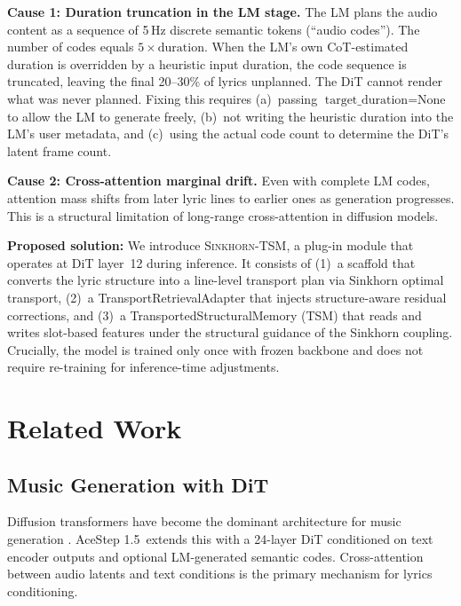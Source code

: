 \documentclass[11pt,a4paper]{article}
\newcommand{\method}{\textsc{Sinkhorn-TSM}}
\newcommand{\dit}{AceStep 1.5}
\begin{document}
\textbf{Cause 1: Duration truncation in the LM stage.} The LM plans the audio content as a sequence of 5\,Hz discrete semantic tokens (``audio codes''). The number of codes equals $5 \times \text{duration}$. When the LM's own CoT-estimated duration is overridden by a heuristic input duration, the code sequence is truncated, leaving the final 20--30\% of lyrics unplanned. The DiT cannot render what was never planned. Fixing this requires (a)~passing $\text{target\_duration}=\text{None}$ to allow the LM to generate freely, (b)~not writing the heuristic duration into the LM's user metadata, and (c)~using the actual code count to determine the DiT's latent frame count.

\textbf{Cause 2: Cross-attention marginal drift.} Even with complete LM codes, attention mass shifts from later lyric lines to earlier ones as generation progresses. This is a structural limitation of long-range cross-attention in diffusion models.

\textbf{Proposed solution:} We introduce \method, a plug-in module that operates at DiT layer~12 during inference. It consists of (1)~a scaffold that converts the lyric structure into a line-level transport plan via Sinkhorn optimal transport, (2)~a TransportRetrievalAdapter that injects structure-aware residual corrections, and (3)~a TransportedStructuralMemory (TSM) that reads and writes slot-based features under the structural guidance of the Sinkhorn coupling. Crucially, the model is trained only once with frozen backbone and does not require re-training for inference-time adjustments.

\section{Related Work}
\label{sec:related}

\subsection{Music Generation with DiT}

Diffusion transformers have become the dominant architecture for music generation \cite{musiclm,audioldm2,muse}. \dit~extends this with a 24-layer DiT conditioned on text encoder outputs and optional LM-generated semantic codes. Cross-attention between audio latents and text conditions is the primary mechanism for lyrics conditioning.
\end{document}

